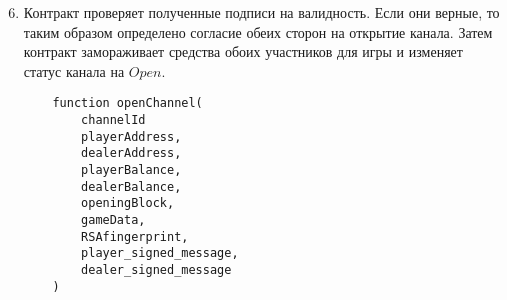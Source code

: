 \begin{algorithm}
\begin{enumerate}
\setcounter{enumi}{5}
\item Контракт проверяет полученные подписи на валидность. Если они верные, то таким образом определено согласие обеих сторон на открытие канала. Затем контракт замораживает средства обоих участников для игры и изменяет статус канала на $Open$. 
\begin{lstlisting}
    function openChannel(
        channelId
        playerAddress,
        dealerAddress,
        playerBalance,
        dealerBalance,
        openingBlock,
        gameData,
        RSAfingerprint,
        player_signed_message,
        dealer_signed_message
    )
\end{lstlisting}
\end{enumerate}
\end{algorithm}



